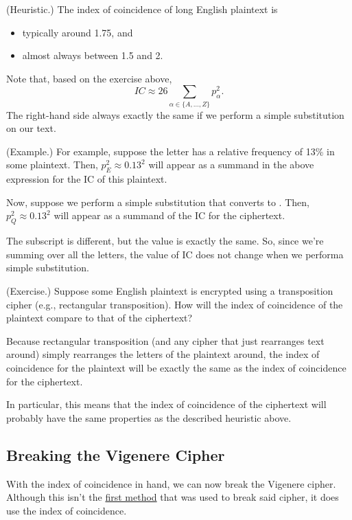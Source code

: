 \documentclass[letterpaper]{article}
\begin{document}
\begin{mdframed}
    (Heuristic.) The index of coincidence of long English plaintext is 
    \begin{itemize}
        \item typically around 1.75, and 
        \item almost always between 1.5 and 2. 
    \end{itemize}
\end{mdframed}

Note that, based on the exercise above,
\[IC \approx 26 \sum_{\alpha \in \{A, \hdots, Z\}} p_\alpha^2.\]
The right-hand side always exactly the same if we perform a simple substitution on our text. 
\begin{mdframed}
    (Example.) For example, suppose the letter  has a relative frequency of 13\% in some plaintext. Then, $p_E^2 \approx 0.13^2$ will appear as a summand in the above expression for the IC of this plaintext. 

    \bigskip 

    Now, suppose we perform a simple substitution that converts  to . Then, $p_Q^2 \approx 0.13^2$ will appear as a summand of the IC for the ciphertext.
\end{mdframed} 
The subscript is different, but the value is exactly the same. So, since we're summing over all the letters, the value of IC does not change when we performa  simple substitution.

\begin{mdframed}
    (Exercise.) Suppose some English plaintext is encrypted using a transposition cipher (e.g., rectangular transposition). How will the index of coincidence of the plaintext compare to that of the ciphertext?

    \begin{mdframed}
        Because rectangular transposition (and any cipher that just rearranges text around) simply rearranges the letters of the plaintext around, the index of coincidence for the plaintext will be exactly the same as the index of coincidence for the ciphertext.

        \bigskip 

        In particular, this means that the index of coincidence of the ciphertext will probably have the same properties as the described heuristic above.
    \end{mdframed}
\end{mdframed}


\subsection{Breaking the Vigenere Cipher}
With the index of coincidence in hand, we can now break the Vigenere cipher. Although this isn't the \href{https://en.wikipedia.org/wiki/Kasiski_examination}{first method} that was used to break said cipher, it does use the index of coincidence.
\end{document}
